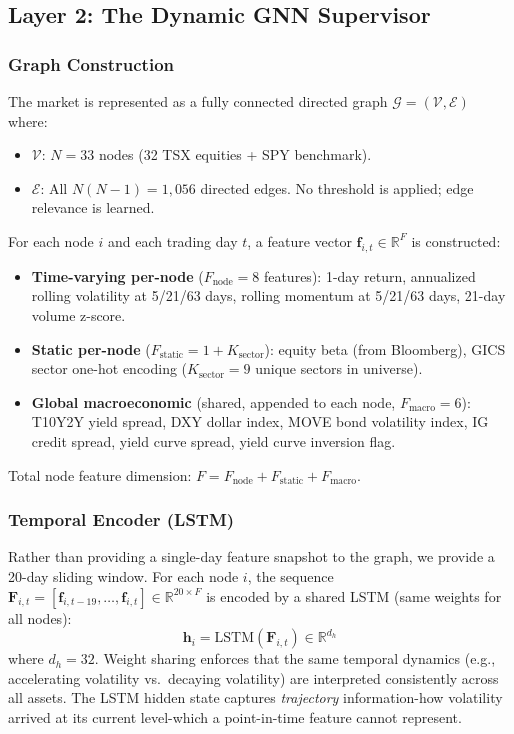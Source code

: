 \documentclass[conferences]{IEEEtran}
\begin{document}
\subsection{Layer 2: The Dynamic GNN Supervisor}

\subsubsection{Graph Construction}
The market is represented as a fully connected directed graph $\mathcal{G} = (\mathcal{V}, \mathcal{E})$ where:
\begin{itemize}
    \item $\mathcal{V}$: $N = 33$ nodes (32 TSX equities + SPY benchmark).
    \item $\mathcal{E}$: All $N(N-1) = 1{,}056$ directed edges. No threshold is applied; edge relevance is learned.
\end{itemize}

For each node $i$ and each trading day $t$, a feature vector $\mathbf{f}_{i,t} \in \mathbb{R}^{F}$ is constructed:

\begin{itemize}
    \item \textbf{Time-varying per-node} ($F_{\text{node}} = 8$ features): 1-day return, annualized rolling volatility at 5/21/63 days, rolling momentum at 5/21/63 days, 21-day volume z-score.
    \item \textbf{Static per-node} ($F_{\text{static}} = 1 + K_{\text{sector}}$): equity beta (from Bloomberg), GICS sector one-hot encoding ($K_{\text{sector}} = 9$ unique sectors in universe).
    \item \textbf{Global macroeconomic} (shared, appended to each node, $F_{\text{macro}} = 6$): T10Y2Y yield spread, DXY dollar index, MOVE bond volatility index, IG credit spread, yield curve spread, yield curve inversion flag.
\end{itemize}

Total node feature dimension: $F = F_{\text{node}} + F_{\text{static}} + F_{\text{macro}}$.

\subsubsection{Temporal Encoder (LSTM)}
Rather than providing a single-day feature snapshot to the graph, we provide a 20-day sliding window. For each node $i$, the sequence $\mathbf{F}_{i,t} = [\mathbf{f}_{i,t-19}, \ldots, \mathbf{f}_{i,t}] \in \mathbb{R}^{20 \times F}$ is encoded by a shared LSTM (same weights for all nodes):
\[
    \mathbf{h}_i = \text{LSTM}(\mathbf{F}_{i,t}) \in \mathbb{R}^{d_h}
\]
where $d_h = 32$. Weight sharing enforces that the same temporal dynamics (e.g., accelerating volatility vs.\ decaying volatility) are interpreted consistently across all assets. The LSTM hidden state captures \emph{trajectory} information-how volatility arrived at its current level-which a point-in-time feature cannot represent.
\end{document}
